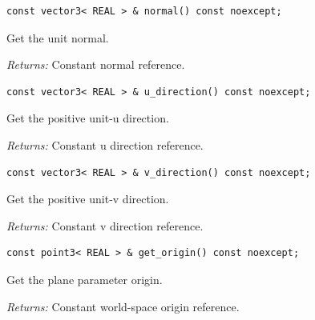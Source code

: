 \par\noindent\begin{minipage}{\linewidth}
\begin{lstlisting}[style=apireference]
const vector3< REAL > & normal() const noexcept;
\end{lstlisting}
{\footnotesize Get the unit normal.\par}
{\footnotesize\textit{Returns:} Constant normal reference.\par}
\end{minipage}\par\vspace{1pt}
\par\noindent\begin{minipage}{\linewidth}
\begin{lstlisting}[style=apireference]
const vector3< REAL > & u_direction() const noexcept;
\end{lstlisting}
{\footnotesize Get the positive unit-u direction.\par}
{\footnotesize\textit{Returns:} Constant u direction reference.\par}
\end{minipage}\par\vspace{1pt}
\par\noindent\begin{minipage}{\linewidth}
\begin{lstlisting}[style=apireference]
const vector3< REAL > & v_direction() const noexcept;
\end{lstlisting}
{\footnotesize Get the positive unit-v direction.\par}
{\footnotesize\textit{Returns:} Constant v direction reference.\par}
\end{minipage}\par\vspace{1pt}
\par\noindent\begin{minipage}{\linewidth}
\begin{lstlisting}[style=apireference]
const point3< REAL > & get_origin() const noexcept;
\end{lstlisting}
{\footnotesize Get the plane parameter origin.\par}
{\footnotesize\textit{Returns:} Constant world-space origin reference.\par}
\end{minipage}\par\vspace{1pt}

